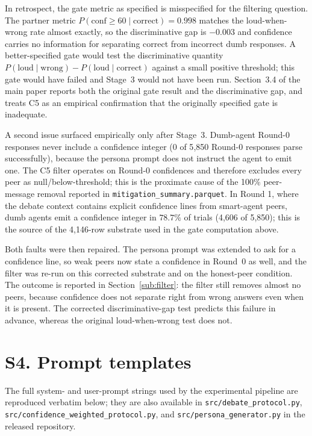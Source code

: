 \documentclass[11pt]{article}
\begin{document}
In retrospect, the gate metric as specified is misspecified for the
filtering question.
The partner metric $P(\text{conf} \geq 60 \mid \text{correct}) = 0.998$
matches the loud-when-wrong rate almost exactly, so the discriminative
gap is $-0.003$ and confidence carries no information for separating
correct from incorrect dumb responses.
A better-specified gate would test the discriminative quantity
$P(\text{loud}\mid\text{wrong}) - P(\text{loud}\mid\text{correct})$
against a small positive threshold; this gate would have failed and
Stage~3 would not have been run.
Section~3.4 of the main paper reports both the original gate result
and the discriminative gap, and treats C5 as an empirical
confirmation that the originally specified gate is inadequate.

A second issue surfaced empirically only after Stage~3.
Dumb-agent Round-0 responses never include a confidence integer (0 of
5{,}850 Round-0 responses parse successfully), because the persona
prompt does not instruct the agent to emit one.
The C5 filter operates on Round-0 confidences and therefore excludes
every peer as null/below-threshold; this is the proximate cause of the
100\% peer-message removal reported in
\texttt{mitigation\_summary.parquet}.
In Round 1, where the debate context contains explicit confidence
lines from smart-agent peers, dumb agents emit a confidence integer in
$78.7\%$ of trials (4{,}606 of 5{,}850); this is the source of the
4{,}146-row substrate used in the gate computation above.

Both faults were then repaired.
The persona prompt was extended to ask for a confidence line, so weak peers
now state a confidence in Round~0 as well, and the filter was re-run on
this corrected substrate and on the honest-peer condition.
The outcome is reported in Section~\ref{sub:filter}: the filter still
removes almost no peers, because confidence does not separate right from
wrong answers even when it is present.
The corrected discriminative-gap test predicts this failure in advance,
whereas the original loud-when-wrong test does not.

\clearpage
\onecolumn
\section*{S4. Prompt templates}
\label{ssec:prompts}

The full system- and user-prompt strings used by the experimental
pipeline are reproduced verbatim below; they are also available in
\texttt{src/debate\_protocol.py},
\texttt{src/confidence\_weighted\_protocol.py}, and
\texttt{src/persona\_generator.py} in the released repository.
\end{document}
